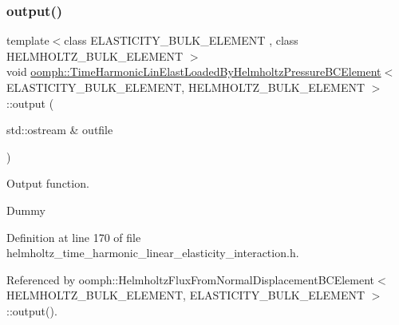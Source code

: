 \subsubsection{\texorpdfstring{output()}{output()}\hspace{0.1cm}{\footnotesize\ttfamily [1/4]}}
{\footnotesize\ttfamily template$<$class E\+L\+A\+S\+T\+I\+C\+I\+T\+Y\+\_\+\+B\+U\+L\+K\+\_\+\+E\+L\+E\+M\+E\+NT , class H\+E\+L\+M\+H\+O\+L\+T\+Z\+\_\+\+B\+U\+L\+K\+\_\+\+E\+L\+E\+M\+E\+NT $>$ \\
void \hyperlink{classoomph_1_1TimeHarmonicLinElastLoadedByHelmholtzPressureBCElement}{oomph\+::\+Time\+Harmonic\+Lin\+Elast\+Loaded\+By\+Helmholtz\+Pressure\+B\+C\+Element}$<$ E\+L\+A\+S\+T\+I\+C\+I\+T\+Y\+\_\+\+B\+U\+L\+K\+\_\+\+E\+L\+E\+M\+E\+NT, H\+E\+L\+M\+H\+O\+L\+T\+Z\+\_\+\+B\+U\+L\+K\+\_\+\+E\+L\+E\+M\+E\+NT $>$\+::output (\begin{DoxyParamCaption}\item[{std\+::ostream \&}]{outfile }\end{DoxyParamCaption})\hspace{0.3cm}{\ttfamily [inline]}}



Output function. 

Dummy 

Definition at line 170 of file helmholtz\+\_\+time\+\_\+harmonic\+\_\+linear\+\_\+elasticity\+\_\+interaction.\+h.



Referenced by oomph\+::\+Helmholtz\+Flux\+From\+Normal\+Displacement\+B\+C\+Element$<$ H\+E\+L\+M\+H\+O\+L\+T\+Z\+\_\+\+B\+U\+L\+K\+\_\+\+E\+L\+E\+M\+E\+N\+T, E\+L\+A\+S\+T\+I\+C\+I\+T\+Y\+\_\+\+B\+U\+L\+K\+\_\+\+E\+L\+E\+M\+E\+N\+T $>$\+::output().

\mbox{\label{classoomph_1_1TimeHarmonicLinElastLoadedByHelmholtzPressureBCElement_a2cfc5c6af366019bc8d8d9bb42ffae03}} 

